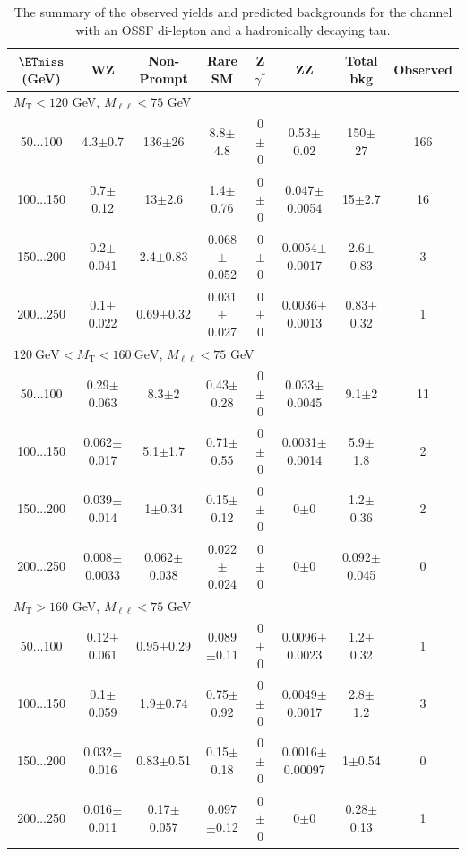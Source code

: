 \begin{landscape}
\begin{table}
\begin{center}
\caption{\label{tab:OSSF1tau1} The summary of the observed yields and predicted backgrounds for the channel 
with an OSSF di-lepton and a hadronically decaying tau. }
\begin{tabular}{| c | c c c c c c c | }\hline\hline
$\ETmiss$ (GeV) & WZ & Non-Prompt & Rare SM & Z$\gamma^*$ & ZZ & Total bkg & Observed\\\hline\hline
\multicolumn{8}{l}{$M_{\text{T}} < 120$ GeV, $M_{\ell\ell} < 75$ GeV}\\\hline\hline
50$\dots$100&4.3$\pm$0.7&136$\pm$26&8.8$\pm$4.8&0$\pm$0&0.53$\pm$0.02&150$\pm$27&166\\
100$\dots$150&0.7$\pm$0.12&13$\pm$2.6&1.4$\pm$0.76&0$\pm$0&0.047$\pm$0.0054&15$\pm$2.7&16\\
150$\dots$200&0.2$\pm$0.041&2.4$\pm$0.83&0.068$\pm$0.052&0$\pm$0&0.0054$\pm$0.0017&2.6$\pm$0.83&3\\
200$\dots$250&0.1$\pm$0.022&0.69$\pm$0.32&0.031$\pm$0.027&0$\pm$0&0.0036$\pm$0.0013&0.83$\pm$0.32&1\\
\hline\hline
\multicolumn{8}{l}{$120~\mathrm{GeV} < M_{\text{T}} < 160~\mathrm{GeV}$, $M_{\ell\ell} < 75$ GeV}\\\hline\hline
50$\dots$100&0.29$\pm$0.063&8.3$\pm$2&0.43$\pm$0.28&0$\pm$0&0.033$\pm$0.0045&9.1$\pm$2&11\\
100$\dots$150&0.062$\pm$0.017&5.1$\pm$1.7&0.71$\pm$0.55&0$\pm$0&0.0031$\pm$0.0014&5.9$\pm$1.8&2\\
150$\dots$200&0.039$\pm$0.014&1$\pm$0.34&0.15$\pm$0.12&0$\pm$0&0$\pm$0&1.2$\pm$0.36&2\\
200$\dots$250&0.008$\pm$0.0033&0.062$\pm$0.038&0.022$\pm$0.024&0$\pm$0&0$\pm$0&0.092$\pm$0.045&0\\
\hline\hline
\multicolumn{8}{l}{$M_{\text{T}} > 160$ GeV, $M_{\ell\ell} < 75$ GeV}\\\hline\hline
50$\dots$100&0.12$\pm$0.061&0.95$\pm$0.29&0.089$\pm$0.11&0$\pm$0&0.0096$\pm$0.0023&1.2$\pm$0.32&1\\
100$\dots$150&0.1$\pm$0.059&1.9$\pm$0.74&0.75$\pm$0.92&0$\pm$0&0.0049$\pm$0.0017&2.8$\pm$1.2&3\\
150$\dots$200&0.032$\pm$0.016&0.83$\pm$0.51&0.15$\pm$0.18&0$\pm$0&0.0016$\pm$0.00097&1$\pm$0.54&0\\
200$\dots$250&0.016$\pm$0.011&0.17$\pm$0.057&0.097$\pm$0.12&0$\pm$0&0$\pm$0&0.28$\pm$0.13&1\\

\end{tabular}
\end{center}
\end{table}
\end{landscape}
